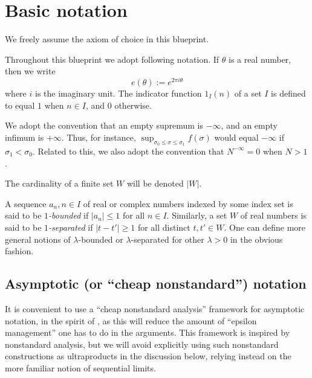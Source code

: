 \chapter{Basic notation}\label{notation-chapter}

We freely assume the axiom of choice in this blueprint.

Throughout this blueprint we adopt following notation. If $\theta$ is a real number, then we write
$$ e(\theta) := e^{2\pi i\theta}$$
where $i$ is the imaginary unit. The indicator function $1_I(n)$ of a set $I$ is defined to equal $1$ when $n \in I$, and $0$ otherwise.

We adopt the convention that an empty supremum is $-\infty$, and an empty infimum is $+\infty$.  Thus, for instance, $\sup_{\sigma_0 \leq \sigma \leq \sigma_1} f(\sigma)$ would equal $-\infty$ if $\sigma_1 < \sigma_0$.  Related to this, we also adopt the convention that $N^{-\infty}=0$ when $N > 1$.

The cardinality of a finite set $W$ will be denoted $|W|$.

A sequence $a_n, n \in I$ of real or complex numbers indexed by some index set is said to be \emph{$1$-bounded} if $|a_n| \leq 1$ for all $n \in I$.  Similarly, a set $W$ of real numbers is said to be \emph{$1$-separated} if $|t-t'| \geq 1$ for all distinct $t,t' \in W$.  One can define more general notions of $\lambda$-bounded or $\lambda$-separated for other $\lambda>0$ in the obvious fashion.

\section{Asymptotic (or ``cheap nonstandard'') notation}

It is convenient to use a ``cheap nonstandard analysis'' framework for asymptotic notation, in the spirit of \cite{tao-cheap}, as this will reduce the amount of ``epsilon management'' one has to do in the arguments.  This framework is inspired by nonstandard analysis, but we will avoid explicitly using such nonstandard constructions as ultraproducts in the discussion below, relying instead on the more familiar notion of sequential limits.

